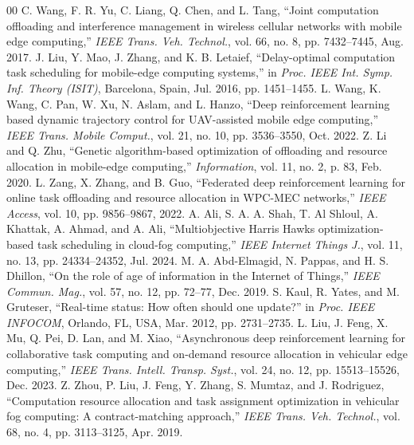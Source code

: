 \documentclass[conference]{IEEEtran}
\begin{document}
\begin{thebibliography}{00}
 C. Wang, F. R. Yu, C. Liang, Q. Chen, and L. Tang, ``Joint computation offloading and interference management in wireless cellular networks with mobile edge computing,'' \textit{IEEE Trans. Veh. Technol.}, vol. 66, no. 8, pp. 7432--7445, Aug. 2017.
 J. Liu, Y. Mao, J. Zhang, and K. B. Letaief, ``Delay-optimal computation task scheduling for mobile-edge computing systems,'' in \textit{Proc. IEEE Int. Symp. Inf. Theory (ISIT)}, Barcelona, Spain, Jul. 2016, pp. 1451--1455.
 L. Wang, K. Wang, C. Pan, W. Xu, N. Aslam, and L. Hanzo, ``Deep reinforcement learning based dynamic trajectory control for UAV-assisted mobile edge computing,'' \textit{IEEE Trans. Mobile Comput.}, vol. 21, no. 10, pp. 3536--3550, Oct. 2022.
 Z. Li and Q. Zhu, ``Genetic algorithm-based optimization of offloading and resource allocation in mobile-edge computing,'' \textit{Information}, vol. 11, no. 2, p. 83, Feb. 2020.
 L. Zang, X. Zhang, and B. Guo, ``Federated deep reinforcement learning for online task offloading and resource allocation in WPC-MEC networks,'' \textit{IEEE Access}, vol. 10, pp. 9856--9867, 2022.
 A. Ali, S. A. A. Shah, T. Al Shloul, A. Khattak, A. Ahmad, and A. Ali, ``Multiobjective Harris Hawks optimization-based task scheduling in cloud-fog computing,'' \textit{IEEE Internet Things J.}, vol. 11, no. 13, pp. 24334--24352, Jul. 2024.
 M. A. Abd-Elmagid, N. Pappas, and H. S. Dhillon, ``On the role of age of information in the Internet of Things,'' \textit{IEEE Commun. Mag.}, vol. 57, no. 12, pp. 72--77, Dec. 2019.
 S. Kaul, R. Yates, and M. Gruteser, ``Real-time status: How often should one update?'' in \textit{Proc. IEEE INFOCOM}, Orlando, FL, USA, Mar. 2012, pp. 2731--2735.
 L. Liu, J. Feng, X. Mu, Q. Pei, D. Lan, and M. Xiao, ``Asynchronous deep reinforcement learning for collaborative task computing and on-demand resource allocation in vehicular edge computing,'' \textit{IEEE Trans. Intell. Transp. Syst.}, vol. 24, no. 12, pp. 15513--15526, Dec. 2023.
 Z. Zhou, P. Liu, J. Feng, Y. Zhang, S. Mumtaz, and J. Rodriguez, ``Computation resource allocation and task assignment optimization in vehicular fog computing: A contract-matching approach,'' \textit{IEEE Trans. Veh. Technol.}, vol. 68, no. 4, pp. 3113--3125, Apr. 2019.
\end{thebibliography}
\end{document}
